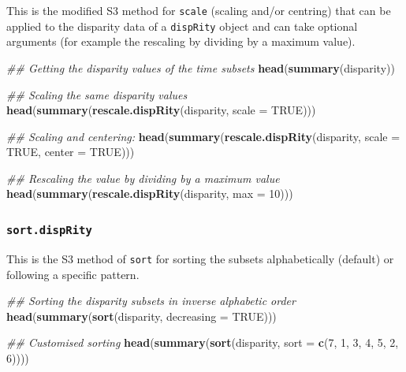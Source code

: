 \documentclass[]{book}
\newenvironment{Shaded}{\begin{snugshade}}{\end{snugshade}}
\newcommand{\CommentTok}[1]{\textcolor[rgb]{0.56,0.35,0.01}{\textit{#1}}}
\newcommand{\DataTypeTok}[1]{\textcolor[rgb]{0.13,0.29,0.53}{#1}}
\newcommand{\DecValTok}[1]{\textcolor[rgb]{0.00,0.00,0.81}{#1}}
\newcommand{\KeywordTok}[1]{\textcolor[rgb]{0.13,0.29,0.53}{\textbf{#1}}}
\newcommand{\NormalTok}[1]{#1}
\newcommand{\OtherTok}[1]{\textcolor[rgb]{0.56,0.35,0.01}{#1}}
\begin{document}
This is the modified S3 method for \texttt{scale} (scaling and/or centring) that can be applied to the disparity data of a \texttt{dispRity} object and can take optional arguments (for example the rescaling by dividing by a maximum value).

\begin{Shaded}
\begin{Highlighting}[]
\CommentTok{## Getting the disparity values of the time subsets}
\KeywordTok{head}\NormalTok{(}\KeywordTok{summary}\NormalTok{(disparity))}

\CommentTok{## Scaling the same disparity values}
\KeywordTok{head}\NormalTok{(}\KeywordTok{summary}\NormalTok{(}\KeywordTok{rescale.dispRity}\NormalTok{(disparity, }\DataTypeTok{scale =} \OtherTok{TRUE}\NormalTok{)))}

\CommentTok{## Scaling and centering:}
\KeywordTok{head}\NormalTok{(}\KeywordTok{summary}\NormalTok{(}\KeywordTok{rescale.dispRity}\NormalTok{(disparity, }\DataTypeTok{scale =} \OtherTok{TRUE}\NormalTok{, }\DataTypeTok{center =} \OtherTok{TRUE}\NormalTok{)))}

\CommentTok{## Rescaling the value by dividing by a maximum value}
\KeywordTok{head}\NormalTok{(}\KeywordTok{summary}\NormalTok{(}\KeywordTok{rescale.dispRity}\NormalTok{(disparity, }\DataTypeTok{max =} \DecValTok{10}\NormalTok{)))}
\end{Highlighting}
\end{Shaded}

\hypertarget{sort.disprity}{%
\subsubsection{\texorpdfstring{\texttt{sort.dispRity}}{sort.dispRity}}\label{sort.disprity}}

This is the S3 method of \texttt{sort} for sorting the subsets alphabetically (default) or following a specific pattern.

\begin{Shaded}
\begin{Highlighting}[]
\CommentTok{## Sorting the disparity subsets in inverse alphabetic order}
\KeywordTok{head}\NormalTok{(}\KeywordTok{summary}\NormalTok{(}\KeywordTok{sort}\NormalTok{(disparity, }\DataTypeTok{decreasing =} \OtherTok{TRUE}\NormalTok{)))}

\CommentTok{## Customised sorting}
\KeywordTok{head}\NormalTok{(}\KeywordTok{summary}\NormalTok{(}\KeywordTok{sort}\NormalTok{(disparity, }\DataTypeTok{sort =} \KeywordTok{c}\NormalTok{(}\DecValTok{7}\NormalTok{, }\DecValTok{1}\NormalTok{, }\DecValTok{3}\NormalTok{, }\DecValTok{4}\NormalTok{, }\DecValTok{5}\NormalTok{, }\DecValTok{2}\NormalTok{, }\DecValTok{6}\NormalTok{))))}
\end{Highlighting}
\end{Shaded}
\end{document}
